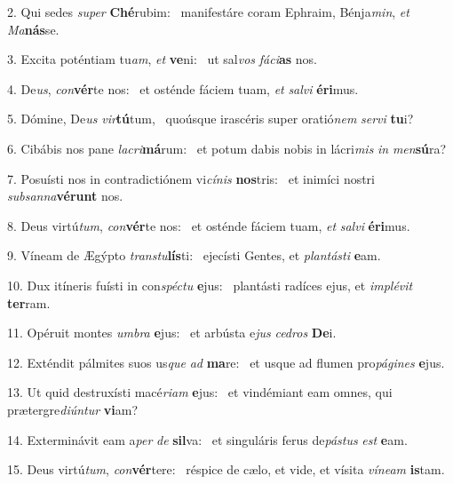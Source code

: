 2. Qui sedes \textit{su}\textit{per} \textbf{Ché}rubim: \ast\  manifestáre coram Ephraim, Bénja\textit{min}, \textit{et} \textit{Ma}\textbf{nás}se.\

3. Excita poténtiam tu\textit{am}, \textit{et} \textbf{ve}ni: \ast\  ut sal\textit{vos} \textit{fá}\textit{ci}\textbf{as} nos.\

4. De\textit{us}, \textit{con}\textbf{vér}te nos: \ast\  et osténde fáciem tuam, \textit{et} \textit{sal}\textit{vi} \textbf{é}\textbf{ri}mus.\

5. Dómine, De\textit{us} \textit{vir}\textbf{tú}tum, \ast\  quoúsque irascéris super oratió\textit{nem} \textit{ser}\textit{vi} \textbf{tu}i?\

6. Cibábis nos pane \textit{la}\textit{cri}\textbf{má}rum: \ast\  et potum dabis nobis in lácri\textit{mis} \textit{in} \textit{men}\textbf{sú}ra?\

7. Posuísti nos in contradictiónem vi\textit{cí}\textit{nis} \textbf{nos}tris: \ast\  et inimíci nostri \textit{sub}\textit{san}\textit{na}\textbf{vé}\textbf{runt} nos.\

8. Deus virtú\textit{tum}, \textit{con}\textbf{vér}te nos: \ast\  et osténde fáciem tuam, \textit{et} \textit{sal}\textit{vi} \textbf{é}\textbf{ri}mus.\

9. Víneam de Ægýpto \textit{trans}\textit{tu}\textbf{lís}ti: \ast\  ejecísti Gentes, et \textit{plan}\textit{tás}\textit{ti} \textbf{e}am.\

10. Dux itíneris fuísti in con\textit{spéc}\textit{tu} \textbf{e}jus: \ast\  plantásti radíces ejus, et \textit{im}\textit{plé}\textit{vit} \textbf{ter}ram.\

11. Opéruit montes \textit{um}\textit{bra} \textbf{e}jus: \ast\  et arbústa e\textit{jus} \textit{ce}\textit{dros} \textbf{De}i.\

12. Exténdit pálmites suos us\textit{que} \textit{ad} \textbf{ma}re: \ast\  et usque ad flumen pro\textit{pá}\textit{gi}\textit{nes} \textbf{e}jus.\

13. Ut quid destruxísti macé\textit{ri}\textit{am} \textbf{e}jus: \ast\  et vindémiant eam omnes, qui prætergre\textit{di}\textit{ún}\textit{tur} \textbf{vi}am?\

14. Exterminávit eam a\textit{per} \textit{de} \textbf{sil}va: \ast\  et singuláris ferus de\textit{pás}\textit{tus} \textit{est} \textbf{e}am.\

15. Deus virtú\textit{tum}, \textit{con}\textbf{vér}tere: \ast\  réspice de cælo, et vide, et vísita \textit{ví}\textit{ne}\textit{am} \textbf{is}tam.\

